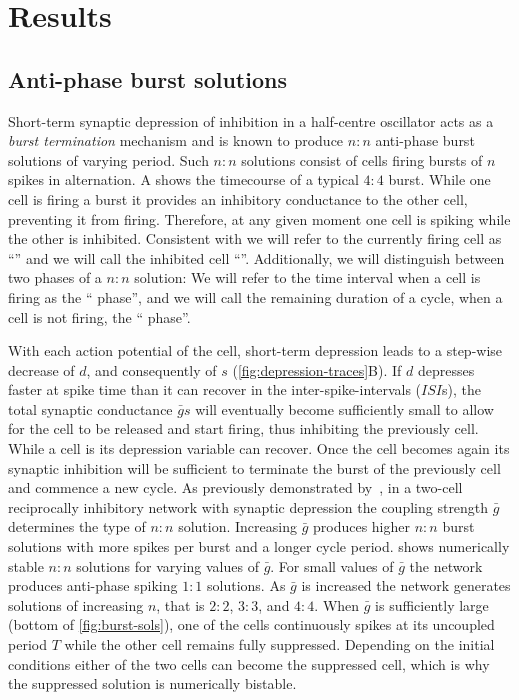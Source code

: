 \section{Results}
\subsection{Anti-phase burst solutions}
Short-term synaptic depression of inhibition in a half-centre oscillator acts as a \emph{burst termination} mechanism \citep{brown1911} and is known to produce $n:n$ anti-phase burst solutions of varying period.
Such $n:n$ solutions consist of cells firing bursts of $n$ spikes in alternation.
A shows the timecourse of a typical $4:4$ burst.
While one cell is firing a burst it provides an inhibitory conductance to the other cell,  preventing it from firing.
Therefore, at any given moment one cell is spiking while the other is inhibited. Consistent with \citet{bose2011} we will refer to the currently firing cell as ``\free{}'' and we will call the inhibited cell ``\suppressed{}''.
Additionally, we will distinguish between two phases of a $n:n$ solution:
We will refer to the time interval when a cell is firing as the ``\free{} phase'', and we will call the remaining duration of a cycle, when a cell is not firing, the ``\suppressed{}  phase''.

With each action potential of the \free{} cell, short-term depression leads to a step-wise decrease of $d$, and consequently of $s$ (\cref{fig:depression-traces}B).
If $d$ depresses faster at spike time than it can recover in the inter-spike-intervals ($ISI$s), the total synaptic conductance $\bar g s$ will eventually become sufficiently small to allow for the \suppressed{} cell to be released and start firing, thus inhibiting the previously \free{} cell.
While a cell is \suppressed{} its depression variable can recover.
Once the \suppressed{} cell becomes \free{} again its synaptic inhibition will be sufficient to terminate the burst of the previously \free{} cell and commence a new cycle.
As previously demonstrated by~\citet{bose2011}, in a two-cell reciprocally inhibitory network with synaptic depression the coupling strength $\bar g$ determines the type of $n:n$ solution.
Increasing $\bar g$ produces higher $n:n$ burst solutions with more spikes per burst and a longer cycle period.
 shows numerically stable $n:n$ solutions for varying values of $\bar g$.
For small values of $\bar g$ the network produces anti-phase spiking $1:1$ solutions.
As $\bar g$ is increased the network generates solutions of increasing $n$, that is $2:2$, $3:3$, and $4:4$.
When $\bar g$ is sufficiently large (bottom of \cref{fig:burst-sols}), one of the cells continuously spikes at its uncoupled period $T$ while the other cell remains fully suppressed.
Depending on the initial conditions either of the two cells can become the suppressed cell, which is why the suppressed solution is numerically bistable.

